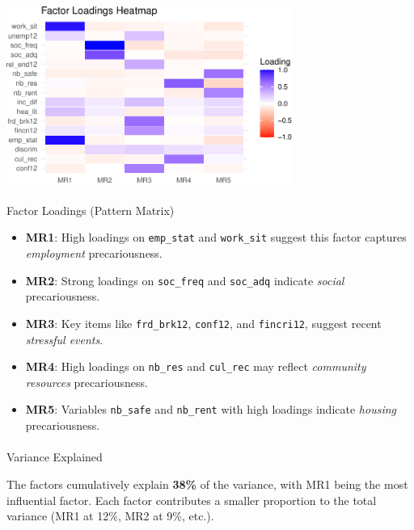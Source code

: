 \documentclass[
]{article}
\makeatletter
\let\oldparagraph\paragraph
\renewcommand{\paragraph}{
    \@ifstar
      \xxxParagraphStar
      \xxxParagraphNoStar
  }
\newcommand{\xxxParagraphStar}[1]{\oldparagraph*{#1}\mbox{}}
\newcommand{\xxxParagraphNoStar}[1]{\oldparagraph{#1}\mbox{}}
\providecommand{\tightlist}{%
  \setlength{\itemsep}{0pt}\setlength{\parskip}{0pt}}\usepackage{longtable,booktabs,array}
\makeatother
\begin{document}
\begin{center}
\includegraphics[width=0.7\textwidth,height=\textheight]{draft_v2_files/figure-pdf/unnamed-chunk-14-1.pdf}
\end{center}

\paragraph{Factor Loadings (Pattern
Matrix)}\label{factor-loadings-pattern-matrix}

\begin{itemize}
\tightlist
\item
  \textbf{MR1}: High loadings on \texttt{emp\_stat} and
  \texttt{work\_sit} suggest this factor captures \emph{employment}
  precariousness.
\item
  \textbf{MR2}: Strong loadings on \texttt{soc\_freq} and
  \texttt{soc\_adq} indicate \emph{social} precariousness.
\item
  \textbf{MR3}: Key items like \texttt{frd\_brk12}, \texttt{conf12}, and
  \texttt{fincri12}, suggest recent \emph{stressful events}.
\item
  \textbf{MR4}: High loadings on \texttt{nb\_res} and \texttt{cul\_rec}
  may reflect \emph{community resources} precariousness.
\item
  \textbf{MR5}: Variables \texttt{nb\_safe} and \texttt{nb\_rent} with
  high loadings indicate \emph{housing} precariousness.
\end{itemize}

\paragraph{Variance Explained}\label{variance-explained}

The factors cumulatively explain \textbf{38\%} of the variance, with MR1
being the most influential factor. Each factor contributes a smaller
proportion to the total variance (MR1 at 12\%, MR2 at 9\%, etc.).
\end{document}
